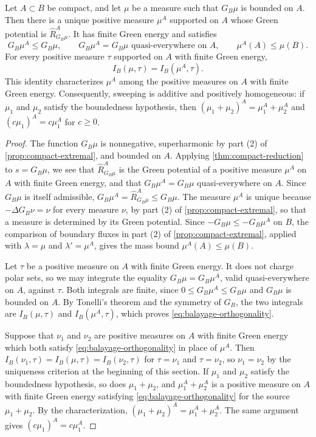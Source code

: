 \begin{theorem}\label{thm:compact-balayage}
Let $A\subset B$ be compact, and let $\mu$ be a measure such that $G_B\mu$ is bounded on $A$. Then there is a unique positive measure $\mu^A$ supported on $A$ whose Green potential is $\widehat R_{G_B\mu}^A$. It has finite Green energy and satisfies
\[
 G_B\mu^A\leq G_B\mu,\qquad G_B\mu^A=G_B\mu\text{ quasi-everywhere on }A,
 \qquad \mu^A(A)\leq\mu(B).
\]
For every positive measure $\tau$ supported on $A$ with finite Green energy,
\begin{equation}\label{eq:balayage-orthogonality}
 I_B(\mu,\tau)=I_B(\mu^A,\tau).
\end{equation}
This identity characterizes $\mu^A$ among the positive measures on $A$ with finite Green energy. Consequently, sweeping is additive and positively homogeneous: if $\mu_1$ and $\mu_2$ satisfy the boundedness hypothesis, then $(\mu_1+\mu_2)^A=\mu_1^A+\mu_2^A$ and $(c\mu_1)^A=c\mu_1^A$ for $c\geq0$.
\end{theorem}
\begin{proof}
The function $G_B\mu$ is nonnegative, superharmonic by part (2) of \cref{prop:compact-extremal}, and bounded on $A$. Applying \cref{thm:compact-reduction} to $s=G_B\mu$, we see that $\widehat R_{G_B\mu}^A$ is the Green potential of a positive measure $\mu^A$ on $A$ with finite Green energy, and that $G_B\mu^A=G_B\mu$ quasi-everywhere on $A$. Since $G_B\mu$ is itself admissible, $G_B\mu^A=\widehat R_{G_B\mu}^A\leq G_B\mu$. The measure $\mu^A$ is unique because $-\Delta G_B\nu=\nu$ for every measure $\nu$, by part (2) of \cref{prop:compact-extremal}, so that a measure is determined by its Green potential. Since $-G_B\mu\leq-G_B\mu^A$ on $B$, the comparison of boundary fluxes in part (2) of \cref{prop:compact-extremal}, applied with $\lambda=\mu$ and $\lambda'=\mu^A$, gives the mass bound $\mu^A(A)\leq\mu(B)$.

Let $\tau$ be a positive measure on $A$ with finite Green energy. It does not charge polar sets, so we may integrate the equality $G_B\mu=G_B\mu^A$, valid quasi-everywhere on $A$, against $\tau$. Both integrals are finite, since $0\leq G_B\mu^A\leq G_B\mu$ and $G_B\mu$ is bounded on $A$. By Tonelli's theorem and the symmetry of $G_B$, the two integrals are $I_B(\mu,\tau)$ and $I_B(\mu^A,\tau)$, which proves \eqref{eq:balayage-orthogonality}.

Suppose that $\nu_1$ and $\nu_2$ are positive measures on $A$ with finite Green energy which both satisfy \eqref{eq:balayage-orthogonality} in place of $\mu^A$. Then $I_B(\nu_1,\tau)=I_B(\mu,\tau)=I_B(\nu_2,\tau)$ for $\tau=\nu_1$ and $\tau=\nu_2$, so $\nu_1=\nu_2$ by the uniqueness criterion at the beginning of this section. If $\mu_1$ and $\mu_2$ satisfy the boundedness hypothesis, so does $\mu_1+\mu_2$, and $\mu_1^A+\mu_2^A$ is a positive measure on $A$ with finite Green energy satisfying \eqref{eq:balayage-orthogonality} for the source $\mu_1+\mu_2$. By the characterization, $(\mu_1+\mu_2)^A=\mu_1^A+\mu_2^A$. The same argument gives $(c\mu_1)^A=c\mu_1^A$.
\end{proof}

